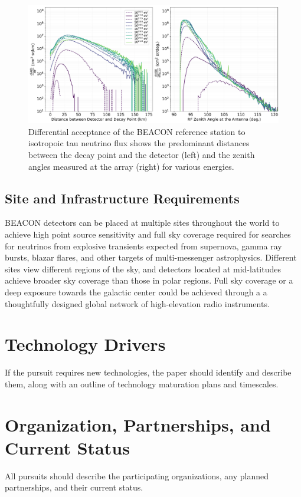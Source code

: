 \documentclass[12pt]{article}
\begin{document}
\begin{figure}[tbhp]
\begin{center}
\includegraphics[width=\textwidth]{figures/diffacceptance_30-80MHz_refdesign}
\caption{Differential acceptance of the BEACON reference station to isotropoic tau neutrino flux shows the predominant distances between the decay point and the detector (left) and the zenith angles measured at the array (right) for various energies.}
\label{fig:diffaccep}
\end{center}
\end{figure}


\subsection{Site and Infrastructure Requirements}

BEACON detectors can be placed at multiple sites throughout the world to achieve high point source sensitivity and full sky coverage required for searches for neutrinos from explosive transients expected from supernova, gamma ray bursts, blazar flares, and other targets of multi-messenger astrophysics. Different sites view different regions of the sky, and detectors located at mid-latitudes achieve broader sky coverage than those in polar regions. Full sky coverage or a deep exposure towards the galactic center could be achieved through a a thoughtfully designed global network of high-elevation radio instruments. 


\section{Technology Drivers}
\color{blue}
If the pursuit requires new technologies, the paper should identify and describe them, along with an outline of technology maturation plans and timescales.
\color{black}

\section{Organization, Partnerships, and
Current Status} 
\color{blue}
All pursuits should describe the participating organizations, any planned partnerships, and their current status.
\color{black}
\end{document}
